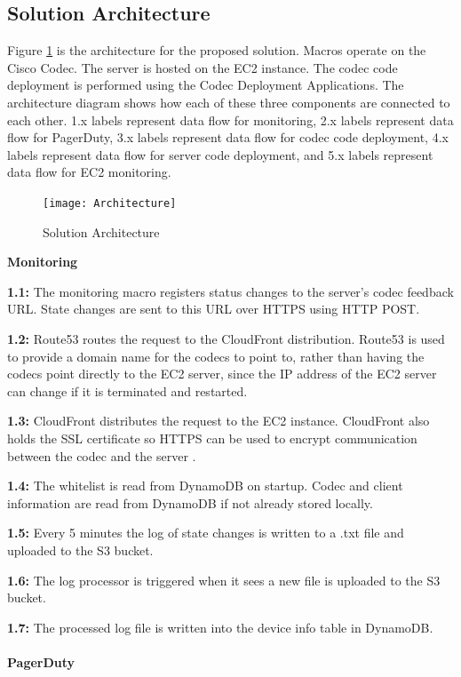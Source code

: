 \documentclass[letterpaper,12pt]{article}
\begin{document}
\subsection{Solution Architecture}
Figure \ref{fig:architecture} is the architecture for the proposed solution. Macros operate on the Cisco Codec. The server is hosted on the EC2 instance. The codec code deployment is performed using the Codec Deployment Applications. The architecture diagram shows how each of these three components are connected to each other. 1.x labels represent data flow for monitoring, 2.x labels represent data flow for PagerDuty, 3.x labels represent data flow for codec code deployment, 4.x labels represent data flow for server code deployment, and 5.x labels represent data flow for EC2 monitoring. 
\begin{figure}[H]
\centering \texttt{[image: Architecture]}
\caption{\label{fig:architecture}Solution Architecture}
\end{figure}
\pagebreak

\textbf{Monitoring}

\textbf{1.1:} The monitoring macro registers status changes to the server's codec feedback URL. State changes are sent to this URL over HTTPS using HTTP POST.

\textbf{1.2:} Route53 routes the request to the CloudFront distribution. Route53 is used to provide a domain name for the codecs to point to, rather than having the codecs point directly to the EC2 server, since the IP address of the EC2 server can change if it is terminated and restarted.

\textbf{1.3:} CloudFront distributes the request to the EC2 instance. CloudFront also holds the SSL certificate so HTTPS can be used to encrypt communication between the codec and the server \cite{https}.

\textbf{1.4:} The whitelist is read from DynamoDB on startup. Codec and client information are read from DynamoDB if not already stored locally.

\textbf{1.5:} Every 5 minutes the log of state changes is written to a .txt file and uploaded to the S3 bucket.

\textbf{1.6:} The log processor is triggered when it sees a new file is uploaded to the S3 bucket. 

\textbf{1.7:} The processed log file is written into the device info table in DynamoDB.\\
\\
\textbf{PagerDuty}
\end{document}
